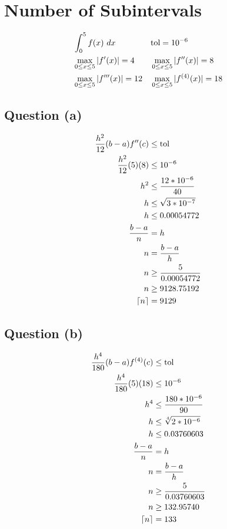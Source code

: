 \section{Number of Subintervals}
	\begin{align}
		&\int_{0}^{5} f(x) \ dx& &\text{tol} = 10^{-6}& \notag \\
		&\max_{0 \leq x \leq 5} |f'(x)| = 4& &\max_{0 \leq x \leq 5} |f''(x)| = 8& \notag \\
		&\max_{0 \leq x \leq 5} |f'''(x)| = 12& &\max_{0 \leq x \leq 5} |f^{(4)}(x)| = 18& \notag
	\end{align}

	\subsection{Question (a)}
		\begin{align}
			\frac{h^{2}}{12}(b-a)f''(c) &\leq \text{tol}& \\
			\frac{h^{2}}{12}(5)(8) &\leq 10^{-6}& \notag \\
			h^{2} &\leq \frac{12*10^{-6}}{40}& \notag \\
			h &\leq \sqrt{3*10^{-7}}& \notag \\
			h &\leq 0.00054772& \\
			\frac{b-a}{n} &= h& \\
			n &= \frac{b-a}{h}& \\
			n &\geq \frac{5}{0.00054772}& \notag \\
			n &\geq 9128.75192& \notag \\
			\lceil n \rceil &= 9129&
		\end{align}

	\subsection{Question (b)}
		\begin{align}
			\frac{h^{4}}{180}(b-a)f^{(4)}(c) &\leq \text{tol}& \\
			\frac{h^{4}}{180}(5)(18) &\leq 10^{-6}& \notag \\
			h^{4} &\leq \frac{180*10^{-6}}{90}& \notag \\
			h &\leq \sqrt[4]{2*10^{-6}}& \notag \\
			h &\leq 0.03760603& \\
			\frac{b-a}{n} &= h& \\
			n &= \frac{b-a}{h}& \\
			n &\geq \frac{5}{0.03760603}& \notag \\
			n &\geq 132.95740& \notag \\
			\lceil n \rceil &= 133&
		\end{align}
